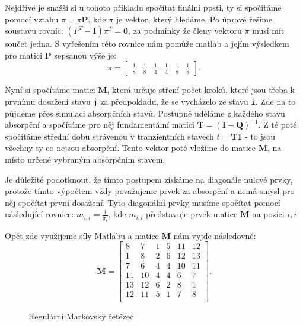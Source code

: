 \documentclass{article}
\begin{document}
Nejdříve je snažší si u tohoto příkladu spočítat finální ppsti, ty si spočítáme pomocí vztahu $\pi = \pi \mathbf{P}$, kde $\pi$ je vektor, který hledáme. Po úpravě řešíme soustavu rovnic: $(P^T - \mathbf{I})\pi^T = \mathbf{0}$, za podmínky že členy vektoru $\pi$ musí mít součet jedna.
S vyřešením této rovnice nám pomůže matlab a jejím výsledkem pro matici $\mathbf P$ sepsanou výše je:
\[
\pi = 
\begin{bmatrix}
    \frac 1 8 & \frac 1 8 & \frac 1 4 & \frac 1 4 &  \frac 1 8 & \frac 1 8 
\end{bmatrix}.
\]

Nyní si spočítáme matici $\mathbf{M}$, která určuje stření počet kroků, které jsou třeba k prvnímu dosažení stavu \verb|j| za předpokladu, že se vycházelo ze stavu \verb|i|. 
Zde na to půjdeme přes simulaci absorpčních stavů. 
Postupně uděláme z každého stavu absorpční a spočítáme pro něj fundamentální matici $\mathbf{T} = (\mathbf{I} - \mathbf{Q})^{-1}$.
Z té poté spočítáme střední dobu strávenou v tranzientních stavech $t = \mathbf{T}\mathbf{1}$ - to jsou všechny ty co nejsou absorpční. 
Tento vektor poté vložíme do matice $\mathbf{M}$, na místo určené vybraným absorpčním stavem. 

Je důležité podotknout, že tímto postupem získáme na diagonále nulové prvky, protože tímto výpočtem vždy považujeme prvek za absorpční a nemá smysl pro něj spočítat první dosažení.
Tyto diagonální prvky musíme spočítat pomocí následující rovnice: $m_{i,i}=\frac{1}{\pi_i}$, kde $m_{i,i}$ představuje prvek matice $\mathbf{M}$ na pozici $i,i$.

Opět zde využijeme síly Matlabu a matice $\mathbf{M}$ nám vyjde následovně:
\[
    \mathbf{M} = 
\begin{bmatrix}
8 & 7 & 1 & 5 & 11 & 12 \\
1 & 8 & 2 & 6 & 12 & 13 \\
7 & 6 & 4 & 4 & 10 & 11 \\
11 & 10 & 4 & 4 & 6 & 7 \\
13 & 12 & 6 & 2 & 8 & 1 \\
12 & 11 & 5 & 1 & 7 & 8 \\
\end{bmatrix}.
\]

\begin{figure}
\centering
{}
\caption{Regulární Markovský řetězec}
\label{fig:markov_chain_1}
    
\end{figure}
\clearpage
\end{document}
